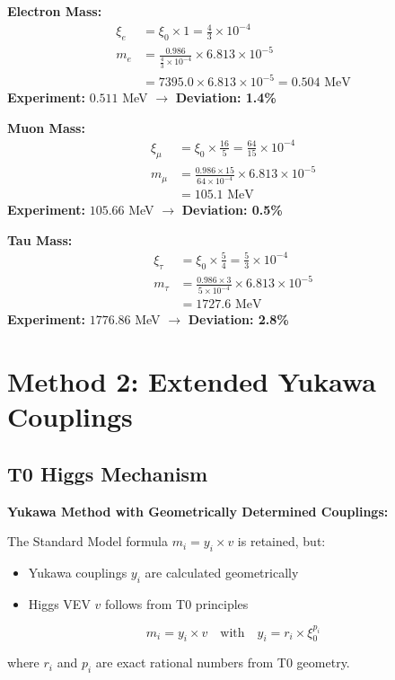 \documentclass[12pt,a4paper]{article}
\begin{document}
	\begin{experimental}
		\textbf{Electron Mass:}
		\begin{align}
			\xi_e &= \xi_0 \times 1 = \frac{4}{3} \times 10^{-4} \\
			m_e &= \frac{0.986}{\frac{4}{3} \times 10^{-4}} \times 6.813 \times 10^{-5} \\
			&= 7395.0 \times 6.813 \times 10^{-5} = 0.504 \text{ MeV}
		\end{align}
		\textbf{Experiment:} $0.511$ MeV $\rightarrow$ \textbf{Deviation: 1.4\%}
		
		\textbf{Muon Mass:}
		\begin{align}
			\xi_\mu &= \xi_0 \times \frac{16}{5} = \frac{64}{15} \times 10^{-4} \\
			m_\mu &= \frac{0.986 \times 15}{64 \times 10^{-4}} \times 6.813 \times 10^{-5} \\
			&= 105.1 \text{ MeV}
		\end{align}
		\textbf{Experiment:} $105.66$ MeV $\rightarrow$ \textbf{Deviation: 0.5\%}
		
		\textbf{Tau Mass:}
		\begin{align}
			\xi_\tau &= \xi_0 \times \frac{5}{4} = \frac{5}{3} \times 10^{-4} \\
			m_\tau &= \frac{0.986 \times 3}{5 \times 10^{-4}} \times 6.813 \times 10^{-5} \\
			&= 1727.6 \text{ MeV}
		\end{align}
		\textbf{Experiment:} $1776.86$ MeV $\rightarrow$ \textbf{Deviation: 2.8\%}
	\end{experimental}
	
	\section{Method 2: Extended Yukawa Couplings}
	
	\subsection{T0 Higgs Mechanism}
	
	\begin{method}
		\textbf{Yukawa Method with Geometrically Determined Couplings:}
		
		The Standard Model formula $m_i = y_i \times v$ is retained, but:
		\begin{itemize}
			\item Yukawa couplings $y_i$ are calculated geometrically
			\item Higgs VEV $v$ follows from T0 principles
		\end{itemize}
		
		\begin{equation}
			\boxed{m_i = y_i \times v \quad \text{with} \quad y_i = r_i \times \xi_0^{p_i}}
		\end{equation}
		
		where $r_i$ and $p_i$ are exact rational numbers from T0 geometry.
	\end{method}
	
\end{document}
